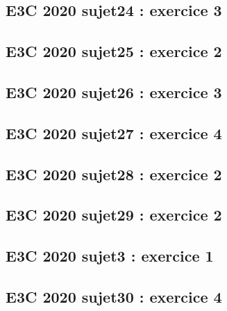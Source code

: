 \documentclass[lang=fr,edition=teacher,layout=sheet]{mxbook}
\begin{document}
\par\bigskip
{}\subsection*{E3C 2020 sujet24 : exercice 3}
\begingroup\endgroup
\par\bigskip
{}\subsection*{E3C 2020 sujet25 : exercice 2}
\begingroup\endgroup
\par\bigskip
{}\subsection*{E3C 2020 sujet26 : exercice 3}
\begingroup\endgroup
\par\bigskip
{}\subsection*{E3C 2020 sujet27 : exercice 4}
\begingroup\endgroup
\par\bigskip
{}\subsection*{E3C 2020 sujet28 : exercice 2}
\begingroup\endgroup
\par\bigskip
{}\subsection*{E3C 2020 sujet29 : exercice 2}
\begingroup\endgroup
\par\bigskip
{}\subsection*{E3C 2020 sujet3 : exercice 1}
\begingroup\endgroup
\par\bigskip
{}\subsection*{E3C 2020 sujet30 : exercice 4}
\end{document}
